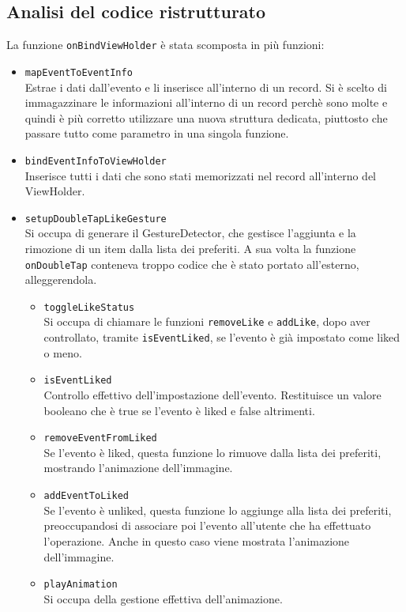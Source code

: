 \subsection{Analisi del codice ristrutturato}
La funzione \verb|onBindViewHolder| è stata scomposta in più funzioni:
\begin{itemize}
    \item \verb|mapEventToEventInfo| \\
    Estrae i dati dall'evento e li inserisce all'interno di un record. Si è scelto di immagazzinare le informazioni all'interno di un record perchè sono molte e quindi è più corretto utilizzare una nuova struttura dedicata, piuttosto che passare tutto come parametro in una singola funzione.
    \item \verb|bindEventInfoToViewHolder| \\
    Inserisce tutti i dati che sono stati memorizzati nel record all'interno del ViewHolder.
    \item \verb|setupDoubleTapLikeGesture| \\
    Si occupa di generare il GestureDetector, che gestisce l'aggiunta e la rimozione di un item dalla lista dei preferiti. A sua volta la funzione \verb|onDoubleTap| conteneva troppo codice che è stato portato all'esterno, alleggerendola.
    \begin{itemize}
        \item \verb|toggleLikeStatus| \\
        Si occupa di chiamare le funzioni \verb|removeLike| e \verb|addLike|, dopo aver controllato, tramite \verb|isEventLiked|, se l'evento è già impostato come liked o meno.
        \item \verb|isEventLiked| \\
        Controllo effettivo dell'impostazione dell'evento. Restituisce un valore booleano che è true se l'evento è liked e false altrimenti.
        \item \verb|removeEventFromLiked| \\
        Se l'evento è liked, questa funzione lo rimuove dalla lista dei preferiti, mostrando l'animazione dell'immagine.
        \item \verb|addEventToLiked| \\
        Se l'evento è unliked, questa funzione lo aggiunge alla lista dei preferiti, preoccupandosi di associare poi l'evento all'utente che ha effettuato l'operazione. Anche in questo caso viene mostrata l'animazione dell'immagine.
        \item \verb|playAnimation| \\
        Si occupa della gestione effettiva dell'animazione.
    \end{itemize}
\end{itemize}
